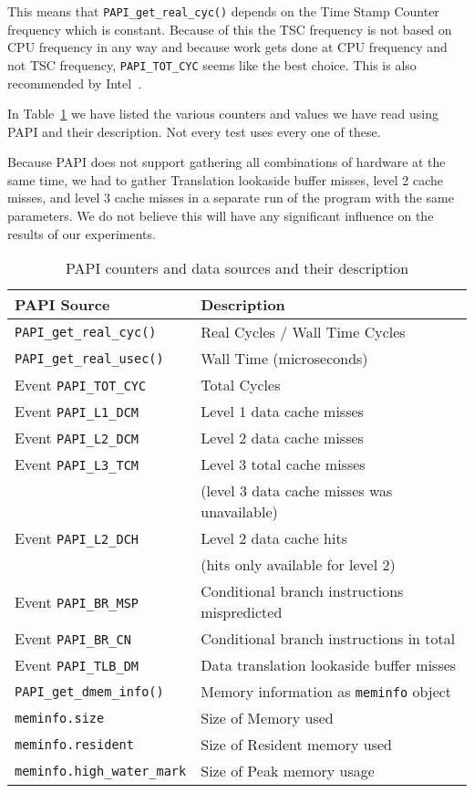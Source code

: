 This means that \texttt{PAPI\_get\_real\_cyc()} depends on the Time Stamp Counter frequency which is constant. 
Because of this the TSC frequency is not based on CPU frequency in any way and because work gets done at CPU frequency and not TSC frequency, \texttt{PAPI\_TOT\_CYC} seems like the best choice. 
This is also recommended by Intel~\citep{IntelMeasuringTheAverageUnhaltedFrequency}.

In Table~\ref{papievents} we have listed the various counters and values we have read using PAPI and their description. Not every test uses every one of these.

Because PAPI does not support gathering all combinations of hardware at the same time, we had to gather Translation lookaside buffer misses, level 2 cache misses, and level 3 cache misses in a separate run of the program with the same parameters.
We do not believe this will have any significant influence on the results of our experiments.

\begin{table}
\caption{PAPI counters and data sources and their description}
\label{papievents}
\center
\begin{tabular}{|l|l|}
\hline
\textbf{PAPI Source}	& \textbf{Description} \\ \hline
\texttt{PAPI\_get\_real\_cyc()}	& Real Cycles / Wall Time Cycles \\ \hline
\texttt{PAPI\_get\_real\_usec()}	& Wall Time (microseconds) \\ \hline
Event \texttt{PAPI\_TOT\_CYC}	& Total Cycles \\ \hline
Event \texttt{PAPI\_L1\_DCM}		& Level 1 data cache misses \\ \hline
Event \texttt{PAPI\_L2\_DCM}		& Level 2 data cache misses \\ \hline
Event \texttt{PAPI\_L3\_TCM}		& Level 3 total cache misses\\
& (level 3 data cache misses was unavailable) \\ \hline
Event \texttt{PAPI\_L2\_DCH}		& Level 2 data cache hits \\
& (hits only available for level 2) \\ \hline
Event \texttt{PAPI\_BR\_MSP}		& Conditional branch instructions mispredicted \\ \hline
Event \texttt{PAPI\_BR\_CN}		& Conditional branch instructions in total \\ \hline
Event \texttt{PAPI\_TLB\_DM}		& Data translation lookaside buffer misses \\ \hline
\texttt{PAPI\_get\_dmem\_info()}	& Memory information as \texttt{meminfo} object \\ \hline
\texttt{meminfo.size}			& Size of Memory used \\ \hline
\texttt{meminfo.resident}		& Size of Resident memory used \\ \hline
\texttt{meminfo.high\_water\_mark}	& Size of Peak memory usage \\ \hline

\end{tabular}
\end{table}
